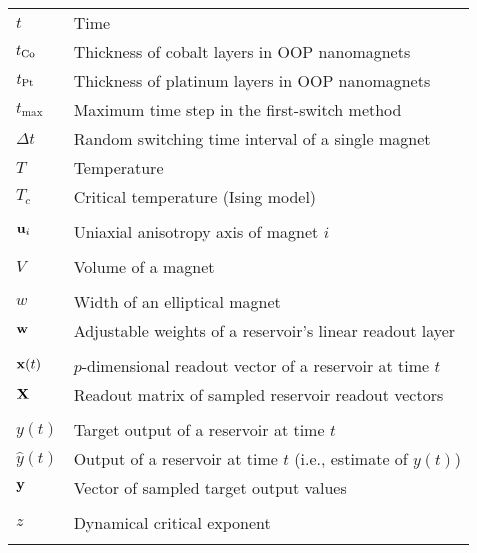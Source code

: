 \begin{longtable}[l]{p{60pt} p{350pt}}
	$t$ & Time \\
	$t_{\ce{Co}}$ & Thickness of cobalt layers in OOP nanomagnets \\
	$t_{\ce{Pt}}$ & Thickness of platinum layers in OOP nanomagnets \\
	$t_\mathrm{max}$ & Maximum time step in the first-switch method \\
	$\Delta t$ & Random switching time interval of a single magnet \\
	$T$ & Temperature \\
	$T_c$ & Critical temperature (Ising model) \\
	&\\

	$\boldsymbol{\mathbf{u}}_i$ & Uniaxial anisotropy axis of magnet $i$ \\
	&\\

	$V$ & Volume of a magnet \\
	&\\

	$w$ & Width of an elliptical magnet \\
	$\boldsymbol{\mathbf{w}}$ & Adjustable weights of a reservoir's linear readout layer \\
	&\\
	
	$\boldsymbol{\mathbf{x}}(t)$ & $p$-dimensional readout vector of a reservoir at time $t$ \\
	$\boldsymbol{\mathbf{X}}$ & Readout matrix of sampled reservoir readout vectors \\
	&\\
	
	$y(t)$ & Target output of a reservoir at time $t$ \\
	$\hat{y}(t)$ & Output of a reservoir at time $t$ (i.e., estimate of $y(t)$) \\
	$\boldsymbol{\mathbf{y}}$ & Vector of sampled target output values \\
	&\\
	
	$z$ & Dynamical critical exponent \\
	&\\
\end{longtable}

